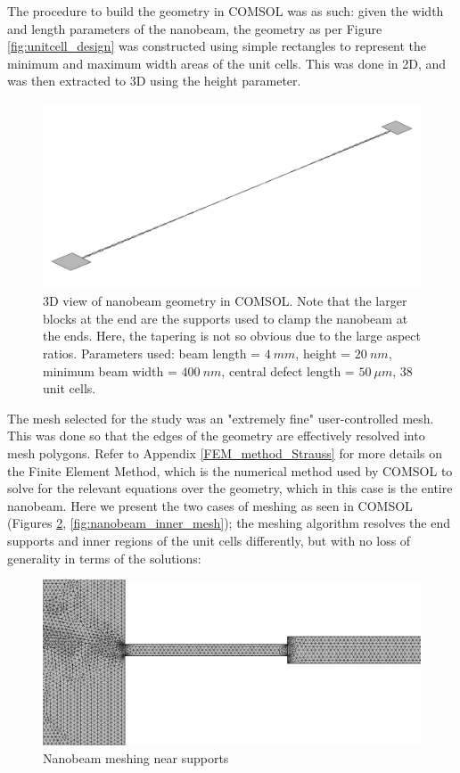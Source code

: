 \documentclass[%
 reprint,
nofootinbib,
 amsmath,amssymb,
 aps,
]{revtex4-2}
\begin{document}
The procedure to build the geometry in COMSOL was as such: given the width and length parameters of the nanobeam, the geometry as per Figure \ref{fig:unitcell_design} was constructed using simple rectangles to represent the minimum and maximum width areas of the unit cells. This was done in 2D, and was then extracted to 3D using the height parameter. 

\begin{figure}[H]
    \centering
    \includegraphics[width = \columnwidth]{COMSOL_nanobeam_geometry.png}
    \caption{3D view of nanobeam geometry in COMSOL. Note that the larger blocks at the end are the supports used to clamp the nanobeam at the ends. Here, the tapering is not so obvious due to the large aspect ratios. Parameters used: beam length = $4 \ mm$, height = $20 \ nm$, minimum beam width = $400 \ nm$, central defect length = $50 \ \mu m$, 38 unit cells.}
    \label{fig:COMSOL_nanobeam}
\end{figure}

The mesh selected for the study was an "extremely fine" user-controlled mesh. This was done so that the edges of the geometry are effectively resolved into mesh polygons. Refer to Appendix \ref{FEM_method_Strauss} for more details on the Finite Element Method, which is the numerical method used by COMSOL to solve for the relevant equations over the geometry, which in this case is the entire nanobeam. Here we present the two cases of meshing as seen in COMSOL (Figures \ref{fig:nanobeam_mesh_supports}, \ref{fig:nanobeam_inner_mesh}); the meshing algorithm resolves the end supports and inner regions of the unit cells differently, but with no loss of generality in terms of the solutions:

\begin{figure}[H]
    \centering
    \includegraphics[width = \columnwidth]{nanobeam_mesh_supports.png}
    \caption{Nanobeam meshing near supports}
    \label{fig:nanobeam_mesh_supports}
\end{figure}
\end{document}
